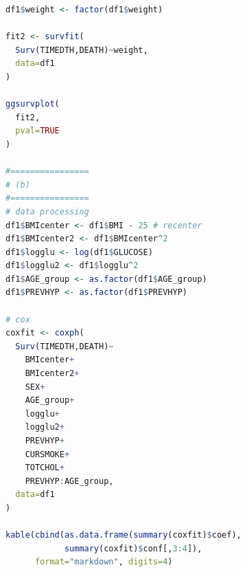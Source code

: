\begin{enumerate}
\begin{lstlisting}[language=R, caption={HW8 R Code}]
df1$weight <- factor(df1$weight)

fit2 <- survfit(
  Surv(TIMEDTH,DEATH)~weight,
  data=df1
)

ggsurvplot(
  fit2,
  pval=TRUE
)

#================
# (b)
#================
# data processing
df1$BMIcenter <- df1$BMI - 25 # recenter
df1$BMIcenter2 <- df1$BMIcenter^2
df1$logglu <- log(df1$GLUCOSE)
df1$logglu2 <- df1$logglu^2
df1$AGE_group <- as.factor(df1$AGE_group)
df1$PREVHYP <- as.factor(df1$PREVHYP)

# cox
coxfit <- coxph(
  Surv(TIMEDTH,DEATH)~
    BMIcenter+
    BMIcenter2+
    SEX+
    AGE_group+
    logglu+
    logglu2+
    PREVHYP+
    CURSMOKE+
    TOTCHOL+
    PREVHYP:AGE_group,
  data=df1
)

kable(cbind(as.data.frame(summary(coxfit)$coef),
            summary(coxfit)$conf[,3:4]),
      format="markdown", digits=4)
\end{lstlisting}
\end{enumerate}